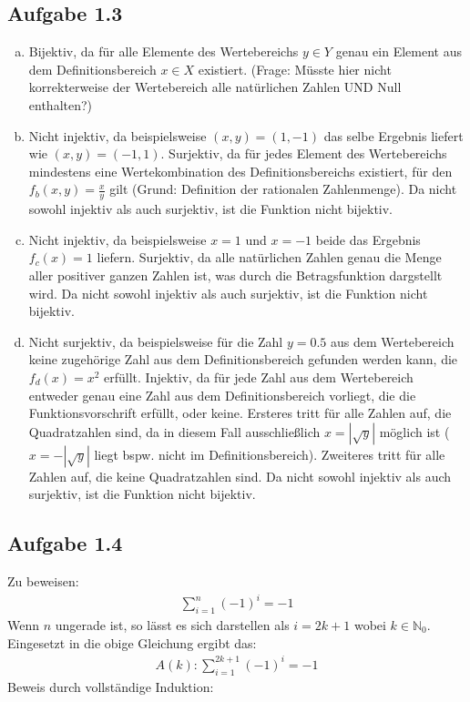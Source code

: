 \documentclass{article}
\begin{document}
    \subsection*{Aufgabe 1.3}
    \begin{enumerate}[(a)]
        \item Bijektiv, da für alle Elemente des Wertebereichs $y \in Y$ genau ein Element aus dem Definitionsbereich 
        $x \in X$ existiert. (Frage: Müsste hier nicht korrekterweise der Wertebereich alle natürlichen Zahlen UND Null enthalten?)
        \item Nicht injektiv, da beispielsweise $(x, y) = (1, -1)$ das selbe Ergebnis liefert wie $(x,y) = (-1, 1)$. Surjektiv, 
        da für jedes Element des Wertebereichs mindestens eine Wertekombination des Definitionsbereichs existiert, für den
        $f_b(x,y) = \frac{x}{y}$ gilt (Grund: Definition der rationalen Zahlenmenge). Da nicht sowohl injektiv als auch surjektiv, ist
        die Funktion nicht bijektiv. 
        \item Nicht injektiv, da beispielsweise $x=1$ und $x=-1$ beide das Ergebnis $f_c(x) = 1$ liefern. Surjektiv, da alle
        natürlichen Zahlen genau die Menge aller positiver ganzen Zahlen ist, was durch die Betragsfunktion dargstellt wird. Da nicht sowohl injektiv als auch surjektiv, ist
        die Funktion nicht bijektiv. 
        \item Nicht surjektiv, da beispielsweise für die Zahl $y=0.5$ aus dem Wertebereich keine zugehörige Zahl aus dem Definitionsbereich
        gefunden werden kann, die $f_d(x) = x^2$ erfüllt. Injektiv, da für jede Zahl aus dem Wertebereich entweder genau eine Zahl aus dem
        Definitionsbereich vorliegt, die die Funktionsvorschrift erfüllt, oder keine. Ersteres tritt für alle Zahlen auf, die
        Quadratzahlen sind, da in diesem Fall ausschließlich $x=|\sqrt{y}|$ möglich ist ($x=-|\sqrt{y}|$ liegt bspw. nicht
        im Definitionsbereich). Zweiteres tritt für alle Zahlen auf, die keine Quadratzahlen sind. Da nicht sowohl injektiv als auch surjektiv, ist
        die Funktion nicht bijektiv. 
    \end{enumerate}


    \subsection*{Aufgabe 1.4}
    Zu beweisen:
    \begin{align*}
        \sum^n_{i=1}(-1)^i=-1
    \end{align*}
    Wenn $n$ ungerade ist, so lässt es sich darstellen als $i=2k+1$ wobei $k \in \mathbb{N}_0$. Eingesetzt in die obige Gleichung
    ergibt das:
    \begin{align*}
        A(k): \sum^{2k+1}_{i=1}(-1)^i=-1
    \end{align*}
    Beweis durch vollständige Induktion:
\end{document}
